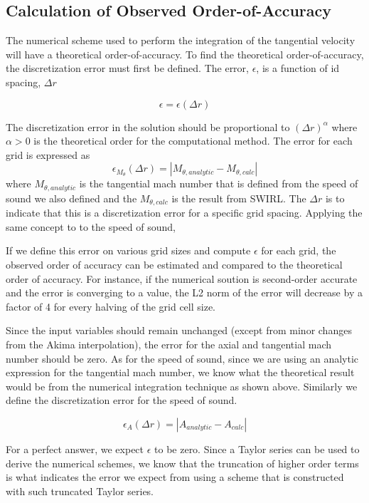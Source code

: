 
\subsection{Calculation of Observed Order-of-Accuracy}
The numerical scheme used to perform the integration of the tangential velocity
will have a theoretical order-of-accuracy. To find the theoretical 
order-of-accuracy, the discretization error must first be defined. The error, 
$\epsilon$, is a function of id spacing, $\Delta r$

\[ \epsilon = \epsilon(\Delta r) \]

The discretization error in the solution should be proportional to 
$\left( \Delta r \right)^{\alpha}$ where $\alpha > 0$ is the theoretical order
for the computational method.  The error for each grid is expressed as 
\[ \epsilon_{M_{\theta}}(\Delta r) = |M_{\theta,analytic}-M_{\theta,calc}|\]
where $M_{\theta,analytic}$ is the tangential mach number that is defined from the
speed of sound we also defined and the $M_{\theta,calc}$ is the result from 
SWIRL. The $\Delta r$ is to indicate that this is a discretization error for a
specific grid spacing. Applying the same concept to to the speed of sound,

If we define this error on various grid sizes and compute $\epsilon$ for
each grid, the observed order of accuracy can be estimated and compared to
the theoretical order of accuracy. For instance, if the numerical soution
is second-order accurate and the error is converging to a value, the L2 norm of
the error will decrease by a factor of 4 for every halving of the grid cell 
size. 

Since the input variables should remain unchanged (except from minor changes 
from the Akima interpolation), the error for the axial and tangential mach 
number should be zero. As for the speed of sound, since we are using an analytic
expression for the tangential mach number, we know what the theoretical result
would be from the numerical integration technique as shown above. 
Similarly we define the discretization error for the speed of sound.

\[ \epsilon_{A}(\Delta r) = |A_{analytic}-A_{calc}|\]

For a perfect answer, we expect $\epsilon$ to be zero. Since a Taylor series can 
be used to derive the numerical schemes, we know that the truncation of higher
order terms is what indicates the error we expect from using a scheme that 
is constructed with such truncated Taylor series.

